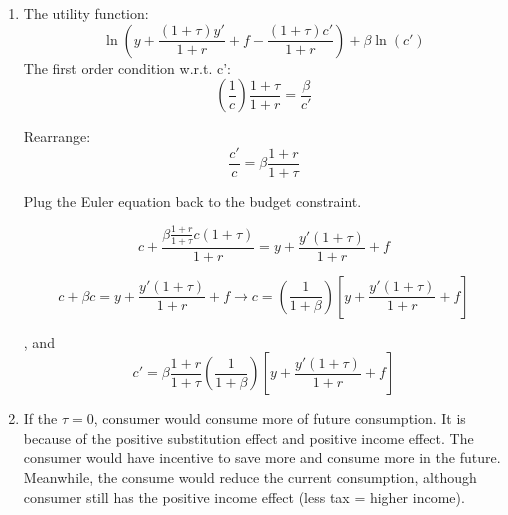 \documentclass[addpoints,12pt,answers]{exam}
\begin{document}
\begin{questions}
\begin{enumerate}[label=(\alph*)]
			\[c+\frac{c' (1+\tau)}{1+r} = y+\frac{y'(1+\tau)}{1+r} + f\]
			
			\item 
			The utility function:
			\[\ln\left(y + \frac{(1+\tau)y'}{1+r} +f - \frac{(1+\tau)c'}{1+r} \right) + \beta\ln(c')\]
			The first order condition w.r.t. c':
			\[\left(\frac{1}{c}\right) \frac{1+\tau}{1+r} = \frac{\beta}{c'}\]
			
			Rearrange:
			\[\frac{c'}{c} = \beta \frac{1+r}{1+\tau}\]
			
			Plug the Euler equation back to the budget constraint.
			
			\[c+\frac{ \beta \frac{1+r}{1+\tau} c (1+\tau)}{1+r} = y+\frac{y'(1+\tau)}{1+r} + f\]
			
			\[c+ \beta  c  = y+\frac{y'(1+\tau)}{1+r} + f \rightarrow c = \left(\frac{1}{1+\beta}\right) \left[y+\frac{y'(1+\tau)}{1+r} + f\right] \]
			
			, and
			\[c'= \beta \frac{1+r}{1+\tau}  \left(\frac{1}{1+\beta}\right) \left[y+\frac{y'(1+\tau)}{1+r} + f\right] \]
			

			\item
			If the $\tau=0$, consumer would consume more of future consumption. It is because of the positive substitution effect  and positive income effect. The consumer would have incentive to save more and consume more in the future. Meanwhile, the consume would reduce the current consumption, although consumer still has the positive income effect (less tax = higher income).
			
		\end{enumerate}
		

\end{questions}
\end{document}
